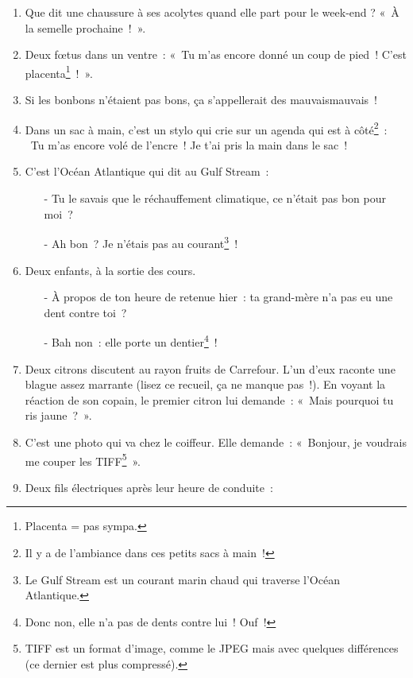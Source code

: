 \documentclass[10pt,a5paper,fullpage]{book}
\begin{document}
\begin{enumerate}
\begin{itemize}
			\item[-] Oh mon Dieu, qu’est-ce qu’elle est LED\footnote{...en plus de ne pas être une lumière.}~!
		\end{itemize}
		\item Que dit une chaussure à ses acolytes quand elle part pour le week-end ? «~À la semelle prochaine~!~».		
		\item Deux fœtus dans un ventre~: « Tu m’as encore donné un coup de pied~! C’est placenta\footnote{Placenta = pas sympa.}~!~».
		\item Si les bonbons n'étaient pas bons, ça s'appellerait des mauvaismauvais~! 
		\item Dans un sac à main, c'est un stylo qui crie sur un agenda qui est à côté\footnote{Il y a de l'ambiance dans ces petits sacs à main~!}~: \guillemotleft~Tu m’as encore volé de l’encre~! Je t’ai pris la main dans le sac~!~\guillemotright
		\item C’est l’Océan Atlantique qui dit au Gulf Stream~:
		\begin{itemize}	
			\item[-] Tu le savais que le réchauffement climatique, ce n’était pas bon pour moi~?
			\item[-] Ah bon~? Je n’étais pas au courant\footnote{Le Gulf Stream est un courant marin chaud qui traverse l’Océan Atlantique.}~!
		\end{itemize}
		\item Deux enfants, à la sortie des cours. 
		\begin{itemize}
			\item[-] À propos de ton heure de retenue hier~: ta grand-mère n’a pas eu une dent contre toi~?
			\item[-] Bah non~: elle porte un dentier\footnote{Donc non, elle n'a pas de dents contre lui~! Ouf~!}~!  
		\end{itemize}
		\item Deux citrons discutent au rayon fruits de Carrefour. L’un d’eux raconte une blague assez marrante (lisez ce recueil, ça ne manque pas~!). En voyant la réaction de son copain, le premier citron lui demande~: «~Mais pourquoi tu ris jaune~?~».
		\item C’est une photo qui va chez le coiffeur. Elle demande~: «~Bonjour, je voudrais me couper les TIFF\footnote{TIFF est un format d’image, comme le JPEG mais avec quelques différences (ce dernier est plus compressé).}~».
		\item Deux fils électriques après leur heure de conduite~: 
		\begin{itemize}

\end{itemize}
\end{enumerate}
\end{document}
